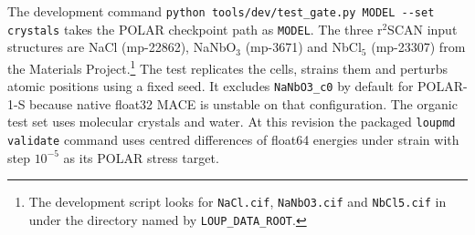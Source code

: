 The development command \verb|python tools/dev/test_gate.py MODEL --set crystals| takes the POLAR checkpoint path as \texttt{MODEL}. The three r$^2$SCAN input structures are NaCl (mp-22862), NaNbO$_3$ (mp-3671) and NbCl$_5$ (mp-23307) from the Materials Project.\footnote{The development script looks for \texttt{NaCl.cif}, \texttt{NaNbO3.cif} and \texttt{NbCl5.cif} in  under the directory named by \texttt{LOUP\_DATA\_ROOT}.} The test replicates the cells, strains them and perturbs atomic positions using a fixed seed. It excludes \texttt{NaNbO3\_c0} by default for POLAR-1-S because native float32 MACE is unstable on that configuration. The organic test set uses molecular crystals and water. At this revision the packaged \texttt{loupmd validate} command uses centred differences of float64 energies under strain with step $10^{-5}$ as its POLAR stress target.
